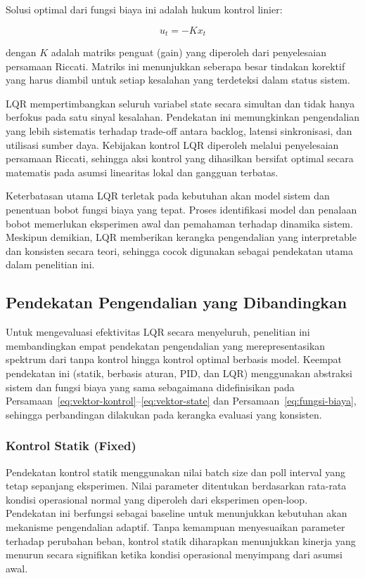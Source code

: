Solusi optimal dari fungsi biaya ini adalah hukum kontrol linier:

\begin{equation}
u_t = -K x_t
\label{eq:hukum-kontrol}
\end{equation}

dengan $K$ adalah matriks penguat (gain) yang diperoleh dari penyelesaian persamaan Riccati.
Matriks ini menunjukkan seberapa besar tindakan korektif yang harus diambil untuk setiap kesalahan yang terdeteksi dalam status sistem.

LQR mempertimbangkan seluruh variabel state secara simultan dan tidak hanya berfokus pada satu sinyal kesalahan.
Pendekatan ini memungkinkan pengendalian yang lebih sistematis terhadap trade-off antara backlog, latensi sinkronisasi, dan utilisasi sumber daya.
Kebijakan kontrol LQR diperoleh melalui penyelesaian persamaan Riccati, sehingga aksi kontrol yang dihasilkan bersifat optimal secara matematis pada asumsi linearitas lokal dan gangguan terbatas.

Keterbatasan utama LQR terletak pada kebutuhan akan model sistem dan penentuan bobot fungsi biaya yang tepat.
Proses identifikasi model dan penalaan bobot memerlukan eksperimen awal dan pemahaman terhadap dinamika sistem.
Meskipun demikian, LQR memberikan kerangka pengendalian yang interpretable dan konsisten secara teori, sehingga cocok digunakan sebagai pendekatan utama dalam penelitian ini.

\subsection{Pendekatan Pengendalian yang Dibandingkan}

Untuk mengevaluasi efektivitas LQR secara menyeluruh, penelitian ini membandingkan empat pendekatan pengendalian yang merepresentasikan spektrum dari tanpa kontrol hingga kontrol optimal berbasis model.
Keempat pendekatan ini (statik, berbasis aturan, PID, dan LQR) menggunakan abstraksi sistem dan fungsi biaya yang sama sebagaimana didefinisikan pada Persamaan~\ref{eq:vektor-kontrol}--\ref{eq:vektor-state} dan Persamaan~\ref{eq:fungsi-biaya}, sehingga perbandingan dilakukan pada kerangka evaluasi yang konsisten.

\subsubsection{Kontrol Statik (Fixed)}

Pendekatan kontrol statik menggunakan nilai batch size dan poll interval yang tetap sepanjang eksperimen.
Nilai parameter ditentukan berdasarkan rata-rata kondisi operasional normal yang diperoleh dari eksperimen open-loop.
Pendekatan ini berfungsi sebagai baseline untuk menunjukkan kebutuhan akan mekanisme pengendalian adaptif.
Tanpa kemampuan menyesuaikan parameter terhadap perubahan beban, kontrol statik diharapkan menunjukkan kinerja yang menurun secara signifikan ketika kondisi operasional menyimpang dari asumsi awal.

